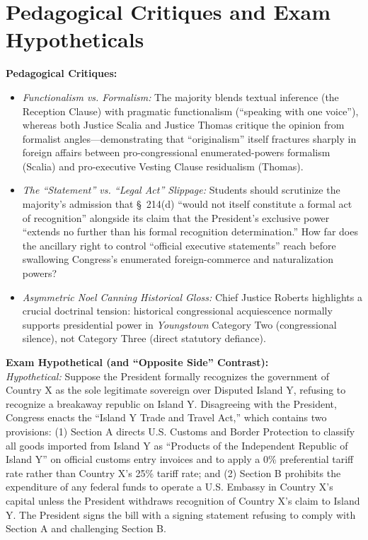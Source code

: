 \documentclass[12pt]{article}
\begin{document}
\section{Pedagogical Critiques and Exam Hypotheticals}
\textbf{Pedagogical Critiques:}
\begin{itemize}
  \item \textit{Functionalism vs. Formalism:} The majority blends textual inference (the Reception Clause) with pragmatic functionalism (``speaking with one voice''), whereas both Justice Scalia and Justice Thomas critique the opinion from formalist angles---demonstrating that ``originalism'' itself fractures sharply in foreign affairs between pro-congressional enumerated-powers formalism (Scalia) and pro-executive Vesting Clause residualism (Thomas).
  \item \textit{The ``Statement'' vs. ``Legal Act'' Slippage:} Students should scrutinize the majority's admission that \S~214(d) ``would not itself constitute a formal act of recognition'' alongside its claim that the President's exclusive power ``extends no further than his formal recognition determination.'' How far does the ancillary right to control ``official executive statements'' reach before swallowing Congress's enumerated foreign-commerce and naturalization powers?
  \item \textit{Asymmetric \textit{Noel Canning} Historical Gloss:} Chief Justice Roberts highlights a crucial doctrinal tension: historical congressional acquiescence normally supports presidential power in \textit{Youngstown} Category Two (congressional silence), not Category Three (direct statutory defiance).
\end{itemize}

\textbf{Exam Hypothetical (and ``Opposite Side'' Contrast):} \\
\textit{Hypothetical:} Suppose the President formally recognizes the government of Country X as the sole legitimate sovereign over Disputed Island Y, refusing to recognize a breakaway republic on Island Y. Disagreeing with the President, Congress enacts the ``Island Y Trade and Travel Act,'' which contains two provisions: (1) Section A directs U.S. Customs and Border Protection to classify all goods imported from Island Y as ``Products of the Independent Republic of Island Y'' on official customs entry invoices and to apply a 0\% preferential tariff rate rather than Country X's 25\% tariff rate; and (2) Section B prohibits the expenditure of any federal funds to operate a U.S. Embassy in Country X's capital unless the President withdraws recognition of Country X's claim to Island Y. The President signs the bill with a signing statement refusing to comply with Section A and challenging Section B.
\end{document}
